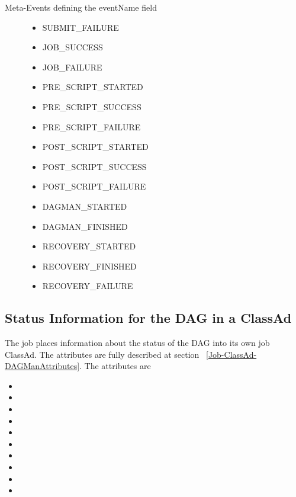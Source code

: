 \begin{description}
\item[Meta-Events defining the eventName field]
\begin{itemize}
\item SUBMIT\_FAILURE
\item JOB\_SUCCESS
\item JOB\_FAILURE
\item PRE\_SCRIPT\_STARTED
\item PRE\_SCRIPT\_SUCCESS
\item PRE\_SCRIPT\_FAILURE
\item POST\_SCRIPT\_STARTED
\item POST\_SCRIPT\_SUCCESS
\item POST\_SCRIPT\_FAILURE
\item DAGMAN\_STARTED
\item DAGMAN\_FINISHED
\item RECOVERY\_STARTED
\item RECOVERY\_FINISHED
\item RECOVERY\_FAILURE
\end{itemize}
\end{description}


\subsection{\label{sec:DAGStatusClassad}Status Information for the DAG in a ClassAd}

The  job places information about the status of the DAG
into its own job ClassAd.
The attributes are fully described at
section ~\ref{Job-ClassAd-DAGManAttributes}.
The attributes are

\begin{itemize}
\item {}
\item {}
\item {}
\item {}
\item {}
\item {}
\item {}
\item {}
\item {}
\item {}
\end{itemize}


